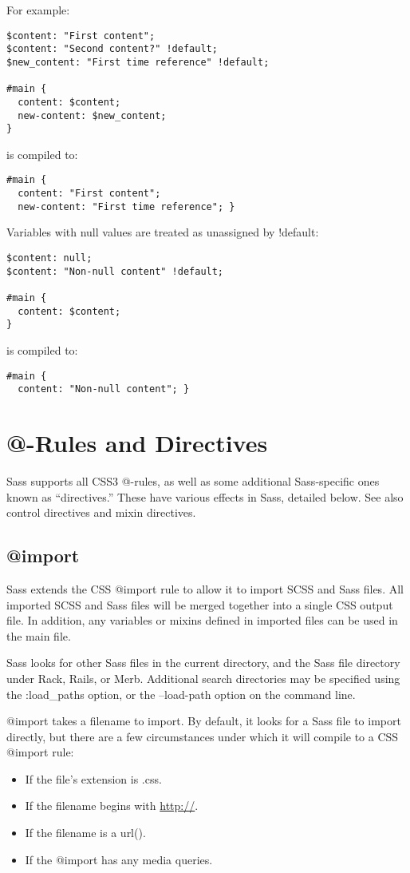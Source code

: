 \documentclass[9pt]{article}
\begin{document}
 For example:
\begin{verbatim}
$content: "First content";
$content: "Second content?" !default;
$new_content: "First time reference" !default;

#main {
  content: $content;
  new-content: $new_content;
}
\end{verbatim}


 is compiled to:
\begin{verbatim}
#main {
  content: "First content";
  new-content: "First time reference"; }
\end{verbatim}


 Variables with null values are treated as unassigned by !default:
\begin{verbatim}
$content: null;
$content: "Non-null content" !default;

#main {
  content: $content;
}
\end{verbatim}


 is compiled to:
\begin{verbatim}
#main {
  content: "Non-null content"; }
\end{verbatim}
\section{@-Rules and Directives}


 Sass supports all CSS3 @-rules, as well as some additional Sass-specific ones known as “directives.” These have various effects in Sass, detailed below. See also control directives and mixin directives.
\subsection{@import}


 Sass extends the CSS @import rule to allow it to import SCSS and Sass files. All imported SCSS and Sass files will be merged together into a single CSS output file. In addition, any variables or mixins defined in imported files can be used in the main file.


 Sass looks for other Sass files in the current directory, and the Sass file directory under Rack, Rails, or Merb. Additional search directories may be specified using the :load\_paths option, or the --load-path option on the command line.


 @import takes a filename to import. By default, it looks for a Sass file to import directly, but there are a few circumstances under which it will compile to a CSS @import rule:
\begin{itemize}
\item If the file’s extension is .css.
\item If the filename begins with \url{http://}.
\item If the filename is a url().
\item If the @import has any media queries.

\end{itemize}
\end{document}
